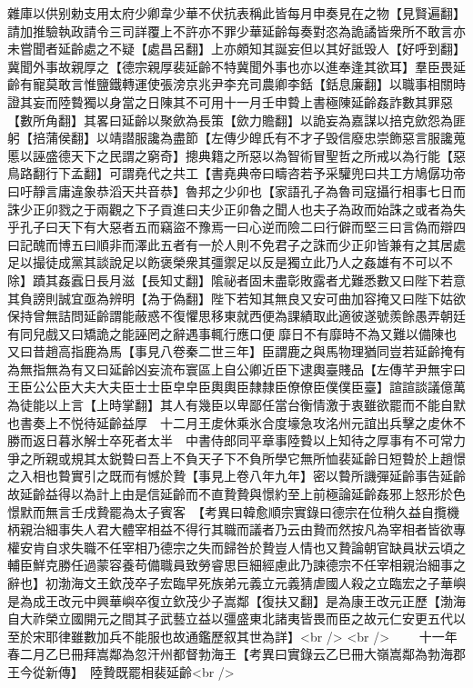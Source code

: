 雜庫以供别勅支用太府少卿韋少華不伏抗表稱此皆每月申奏見在之物【見賢遍翻】請加推驗執政請令三司詳覆上不許亦不罪少華延齡每奏對恣為詭譎皆衆所不敢言亦未嘗聞者延齡處之不疑【處昌呂翻】上亦頗知其誕妄但以其好詆毁人【好呼到翻】冀聞外事故親厚之【德宗親厚裴延齡不特冀聞外事也亦以進奉逢其欲耳】羣臣畏延齡有寵莫敢言惟鹽鐵轉運使張滂京兆尹李充司農卿李銛【銛息廉翻】以職事相關時證其妄而陸䞇獨以身當之日陳其不可用十一月壬申䞇上書極陳延齡姦詐數其罪惡【數所角翻】其畧曰延齡以聚歛為長策【歛力贍翻】以詭妄為嘉謀以掊克歛怨為匪躬【掊蒲侯翻】以靖譛服讒為盡節【左傳少皥氏有不才子毁信廢忠崇飾惡言服讒蒐慝以誣盛德天下之民謂之窮奇】摠典籍之所惡以為智術冒聖哲之所戒以為行能【惡鳥路翻行下孟翻】可謂堯代之共工【書堯典帝曰疇咨若予采驩兜曰共工方鳩僝功帝曰吁靜言庸違象恭滔天共音恭】魯邦之少卯也【家語孔子為魯司寇攝行相事七日而誅少正卯戮之于兩觀之下子貢進曰夫少正卯魯之聞人也夫子為政而始誅之或者為失乎孔子曰天下有大惡者五而竊盜不豫焉一曰心逆而險二曰行僻而堅三曰言偽而辯四曰記醜而博五曰順非而澤此五者有一於人則不免君子之誅而少正卯皆兼有之其居處足以撮徒成黨其談說足以飭褒榮衆其彊禦足以反是獨立此乃人之姦雄有不可以不除】蹟其姦蠧日長月滋【長知丈翻】隂祕者固未盡彰敗露者尤難悉數又曰陛下若意其負謗則誠宜亟為辨明【為于偽翻】陛下若知其無良又安可曲加容掩又曰陛下姑欲保持曾無詰問延齡謂能蔽惑不復懼思移東就西便為課績取此適彼遂號羨餘愚弄朝廷有同兒戲又曰矯詭之能誣罔之辭遇事輒行應口便靡日不有靡時不為又難以備陳也又曰昔趙高指鹿為馬【事見八卷秦二世三年】臣謂鹿之與馬物理猶同豈若延齡掩有為無指無為有又曰延齡凶妄流布寰區上自公卿近臣下逮輿臺賤品【左傳芊尹無宇曰王臣公公臣大夫大夫臣士士臣皁皁臣輿輿臣隸隸臣僚僚臣僕僕臣臺】諠諠談議億萬為徒能以上言【上時掌翻】其人有幾臣以卑鄙任當台衡情激于衷雖欲罷而不能自默也書奏上不悦待延齡益厚　十二月王䖍休乘氷合度壕急攻洺州元誼出兵擊之䖍休不勝而返日暮氷解士卒死者太半　中書侍郎同平章事陸䞇以上知待之厚事有不可常力爭之所親或規其太鋭䞇曰吾上不負天子下不負所學它無所恤裴延齡日短䞇於上趙憬之入相也䞇實引之既而有憾於贄【事見上卷八年九年】密以䞇所譏彈延齡事告延齡故延齡益得以為計上由是信延齡而不直贄贄與憬約至上前極論延齡姦邪上怒形於色憬默而無言壬戌贄罷為太子賓客　【考異曰韓愈順宗實錄曰德宗在位稍久益自攬機柄親治細事失人君大體宰相益不得行其職而議者乃云由贄而然按凡為宰相者皆欲專權安肯自求失職不任宰相乃德宗之失而歸咎於贄豈人情也又贄論朝官缺員狀云頃之輔臣鮮克勝任過蒙容養苟備職員致勞睿思巨細經慮此乃諫德宗不任宰相親治細事之辭也】初渤海文王欽茂卒子宏臨早死族弟元義立元義猜虐國人殺之立臨宏之子華嶼是為成王改元中興華嶼卒復立欽茂少子嵩鄰【復扶又翻】是為康王改元正歷【渤海自大祚榮立國開元之間其子武藝立益以彊盛東北諸夷皆畏而臣之故元仁安更五代以至於宋耶律雖數加兵不能服也故通鑑歷叙其世為詳】<br />
<br />
　　十一年春二月乙巳冊拜嵩鄰為忽汗州都督勃海王【考異曰實錄云乙巳冊大嶺嵩鄰為勃海郡王今從新傳】　陸贄既罷相裴延齡<br />
